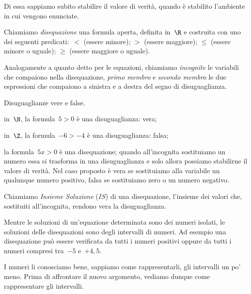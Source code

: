 Di essa sappiamo subito stabilire il valore di verità, quando è
stabilito l'ambiente in cui vengono enunciate.

\begin{definizione}{}{}
Chiamiamo \emph{disequazione} una formula aperta,
definita in~\(\R\) e costruita con uno dei seguenti predicati:~\(<\)
(essere minore); \(>\) (essere maggiore); \({\leq}\)
(essere minore o uguale); \({\geq}\) (essere
maggiore o uguale).
\end{definizione}

Analogamente a quanto detto per le equazioni, chiamiamo
\emph{incognite} le variabili che compaiono nella disequazione,
\emph{primo membro} e \emph{secondo membro} le due espressioni che
compaiono a sinistra e a destra del segno di disuguaglianza.

 \begin{esempio}{}{}
 Disuguaglianze vere e false.

 \begin{enumeratea}
\item in~\(\N\), la formula~\(5>0\) è una disuguaglianza: vera;
\item in~\(\Z\), la formula~\(-6>-4\) è una disuguaglianza: falsa;
\item la formula~\(5x>0\) è una disequazione; quando
all'incognita sostituiamo un numero essa si trasforma
in una disuguaglianza e solo allora possiamo stabilirne il valore di
verità. Nel caso proposto è vera se sostituiamo
alla variabile un qualunque numero positivo, falsa se
sostituiamo zero o un numero negativo.
\end{enumeratea}
 \end{esempio}



\begin{definizione}{}{}
Chiamiamo \emph{Insieme Soluzione} (\(IS\)) di una disequazione, l'insieme 
dei valori che, sostituiti all'incognita, rendono vera la disuguaglianza.
\end{definizione}

Mentre le soluzioni di un'equazione determinata sono dei numeri isolati, 
le soluzioni delle disequazioni sono degli intervalli di numeri.
Ad esempio una disequazione può essere verificata da tutti i numeri 
positivi oppure da tutti i numeri compresi tra~\(-5\) e~\(+4,5\).

I numeri li conosciamo bene, sappiamo come rappresentarli, gli intervalli
un po' meno.
Prima di affrontare il nuovo argomento, vediamo dunque come rappresentare 
gli intervalli.

